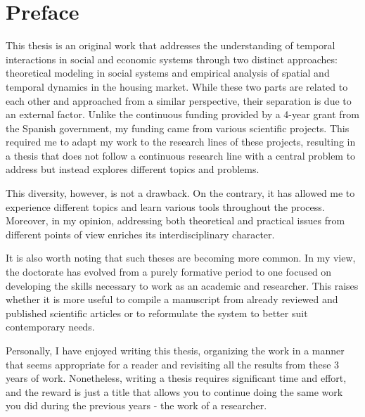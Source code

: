 \pagebreak
\thispagestyle{empty}
\section*{Preface}

This thesis is an original work that addresses the understanding of temporal interactions in social and economic systems through two distinct approaches: theoretical modeling in social systems and empirical analysis of spatial and temporal dynamics in the housing market. While these two parts are related to each other and approached from a similar perspective, their separation is due to an external factor. Unlike the continuous funding provided by a 4-year grant from the Spanish government, my funding came from various scientific projects. This required me to adapt my work to the research lines of these projects, resulting in a thesis that does not follow a continuous research line with a central problem to address but instead explores different topics and problems.

This diversity, however, is not a drawback. On the contrary, it has allowed me to experience different topics and learn various tools throughout the process. Moreover, in my opinion, addressing both theoretical and practical issues from different points of view enriches its interdisciplinary character.

It is also worth noting that such theses are becoming more common. In my view, the doctorate has evolved from a purely formative period to one focused on developing the skills necessary to work as an academic and researcher. This raises whether it is more useful to compile a manuscript from already reviewed and published scientific articles or to reformulate the system to better suit contemporary needs.

Personally, I have enjoyed writing this thesis, organizing the work in a manner that seems appropriate for a reader and revisiting all the results from these 3 years of work. Nonetheless, writing a thesis requires significant time and effort, and the reward is just a title that allows you to continue doing the same work you did during the previous years - the work of a researcher.



\vfill